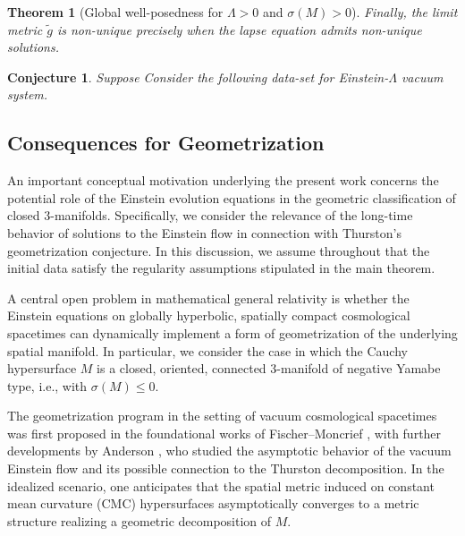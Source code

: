 \documentclass{amsart}
\newtheorem{remark}{Remark}
\newtheorem{theorem}{Theorem}[section]
\newtheorem{conjecture}{Conjecture}[section]
\begin{document}
\begin{theorem}[Global well-posedness for $\Lambda > 0$ and $\sigma(M)>0$]
\noindent Finally, the limit metric $\widetilde{g}$ is non-unique precisely when the lapse equation admits non-unique solutions.

\end{theorem}



\begin{conjecture}
 Suppose Consider the following data-set for Einstein-$\Lambda$ vacuum system.    
\end{conjecture}


\subsection{Consequences for Geometrization}

\noindent An important conceptual motivation underlying the present work concerns the potential role of the Einstein evolution equations in the geometric classification of closed $3$-manifolds. Specifically, we consider the relevance of the long-time behavior of solutions to the Einstein flow in connection with Thurston's geometrization conjecture. In this discussion, we assume throughout that the initial data satisfy the regularity assumptions stipulated in the main theorem.

\noindent A central open problem in mathematical general relativity is whether the Einstein equations on globally hyperbolic, spatially compact cosmological spacetimes can dynamically implement a form of geometrization of the underlying spatial manifold. In particular, we consider the case in which the Cauchy hypersurface \( M \) is a closed, oriented, connected $3$-manifold of negative Yamabe type, i.e., with \( \sigma(M) \leq 0 \).

\noindent The geometrization program in the setting of vacuum cosmological spacetimes was first proposed in the foundational works of Fischer--Moncrief \cite{fischer2000reduced,fischer2001reduced}, with further developments by Anderson \cite{anderson2001long}, who studied the asymptotic behavior of the vacuum Einstein flow and its possible connection to the Thurston decomposition. In the idealized scenario, one anticipates that the spatial metric induced on constant mean curvature (CMC) hypersurfaces asymptotically converges to a metric structure realizing a geometric decomposition of \( M \).
\end{document}
